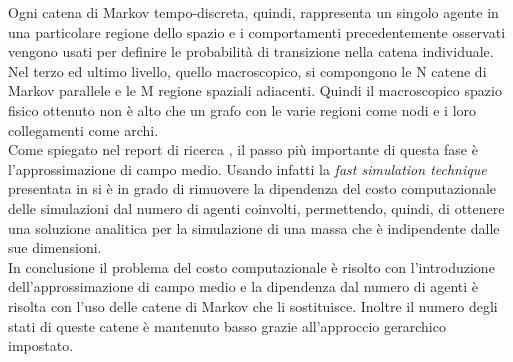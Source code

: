 Ogni catena di Markov tempo-discreta, quindi, rappresenta un singolo agente in una particolare regione dello spazio e i comportamenti precedentemente osservati vengono usati per definire le probabilità di transizione nella catena individuale.\\
Nel terzo ed ultimo livello, quello macroscopico, si compongono le N catene di Markov parallele e le M regione spaziali adiacenti. Quindi il macroscopico spazio fisico ottenuto non è alto che un grafo con le varie regioni come nodi e i loro collegamenti come archi.\\
Come spiegato nel report di ricerca \cite{hierarchical-report}, il passo più importante di questa fase è l'approssimazione di campo medio. Usando infatti la \textit{fast simulation technique} presentata in \cite{mean-field} si è in grado di rimuovere la dipendenza del costo computazionale delle simulazioni dal numero di agenti coinvolti, permettendo, quindi, di ottenere una soluzione analitica per la simulazione di una massa che è indipendente dalle sue dimensioni.\\
In conclusione il problema del costo computazionale è risolto con l'introduzione dell'approssimazione di campo medio e la dipendenza dal numero di agenti è risolta con l'uso delle catene di Markov che li sostituisce. Inoltre il numero degli stati di queste catene è mantenuto basso grazie all'approccio gerarchico impostato.
